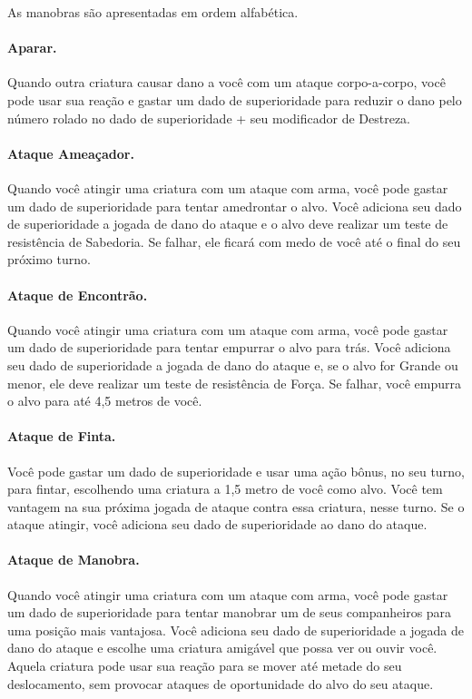 \documentclass{RPG_Adventure}[2021/10/20]
\begin{document}
As manobras são apresentadas em ordem alfabética.

\paragraph{Aparar.} Quando outra criatura causar dano a você com um ataque
corpo-a-corpo, você pode usar sua reação e gastar um dado de superioridade para
reduzir o dano pelo número rolado no dado de superioridade + seu modificador de
Destreza.

\paragraph{Ataque Ameaçador.} Quando você atingir uma criatura com um ataque com
arma, você pode gastar um dado de superioridade para tentar amedrontar o alvo.
Você adiciona seu dado de superioridade a jogada de dano do ataque e o alvo deve
realizar um teste de resistência de Sabedoria. Se falhar, ele ficará com medo de
você até o final do seu próximo turno.

\paragraph{Ataque de Encontrão.} Quando você atingir uma criatura com um ataque
com arma, você pode gastar um dado de superioridade para tentar empurrar o alvo
para trás. Você adiciona seu dado de superioridade a jogada de dano do ataque e,
se o alvo for Grande ou menor, ele deve realizar um teste de resistência de
Força. Se falhar, você empurra o alvo para até 4,5 metros de você.

\paragraph{Ataque de Finta.} Você pode gastar um dado de superioridade e usar
uma ação bônus, no seu turno, para fintar, escolhendo uma criatura a 1,5 metro
de você como alvo. Você tem vantagem na sua próxima jogada de ataque contra essa
criatura, nesse turno. Se o ataque atingir, você adiciona seu dado de
superioridade ao dano do ataque.

\paragraph{Ataque de Manobra.} Quando você atingir uma criatura com um ataque
com arma, você pode gastar um dado de superioridade para tentar manobrar um de
seus companheiros para uma posição mais vantajosa. Você adiciona seu dado de
superioridade a jogada de dano do ataque e escolhe uma criatura amigável que
possa ver ou ouvir você. Aquela criatura pode usar sua reação para se mover até
metade do seu deslocamento, sem provocar ataques de oportunidade do alvo do seu
ataque.
\end{document}
